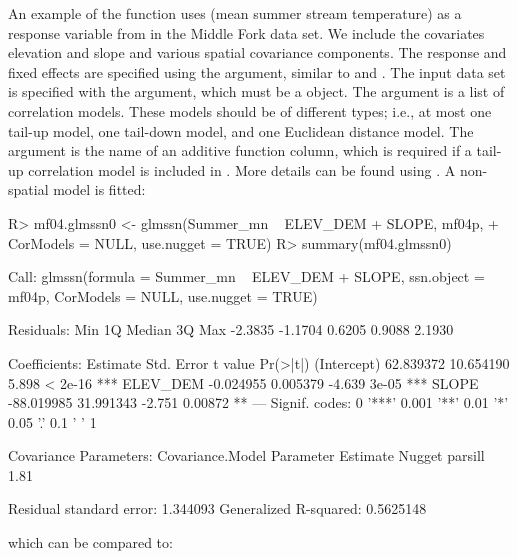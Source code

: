 \documentclass[nojss]{jss}
\renewenvironment{Schunk}{\vspace{\topsep}}{\vspace{\topsep}}
\begin{document}
An example of the  function uses  (mean
summer stream temperature) as a response variable from in the Middle
Fork data set. We include the covariates elevation and slope and
various spatial covariance components. The response and fixed effects
are specified using the  argument, similar to 
and . The input data set is specified with the 
argument, which must be a  object. The
 argument is a list of correlation models. These
models should be of different types; i.e., at most one tail-up model,
one tail-down model, and one Euclidean distance model. The
 argument is the name of an additive function column,
which is required if a tail-up correlation model is included in
. More details can be found using
. A non-spatial model is fitted:

\begin{Schunk}
\begin{Sinput}
R> mf04.glmssn0 <- glmssn(Summer_mn ~ ELEV_DEM + SLOPE, mf04p,
+     CorModels = NULL, use.nugget = TRUE)
R> summary(mf04.glmssn0)
\end{Sinput}
\begin{Soutput}
Call:
glmssn(formula = Summer_mn ~ ELEV_DEM + SLOPE, ssn.object = mf04p, 
    CorModels = NULL, use.nugget = TRUE)

Residuals:
    Min      1Q  Median      3Q     Max 
-2.3835 -1.1704  0.6205  0.9088  2.1930 

Coefficients:
              Estimate Std. Error t value Pr(>|t|)    
(Intercept)  62.839372  10.654190   5.898  < 2e-16 ***
ELEV_DEM     -0.024955   0.005379  -4.639    3e-05 ***
SLOPE       -88.019985  31.991343  -2.751  0.00872 ** 
---
Signif. codes:  0 '***' 0.001 '**' 0.01 '*' 0.05 '.' 0.1 ' ' 1

Covariance Parameters:
 Covariance.Model Parameter Estimate
           Nugget   parsill     1.81

Residual standard error: 1.344093
Generalized R-squared: 0.5625148
\end{Soutput}
\end{Schunk}

which can be compared to:
\end{document}
